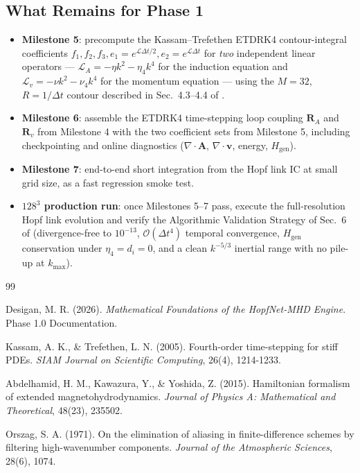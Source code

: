 \documentclass[11pt, a4paper]{article}
\renewcommand{\div}{\nabla \cdot}
\begin{document}
\subsection{What Remains for Phase 1}
\begin{itemize}
    \item \textbf{Milestone 5}: precompute the Kassam--Trefethen ETDRK4
    contour-integral coefficients $f_1, f_2, f_3, e_1=e^{\mathcal{L}\Delta
    t/2}, e_2=e^{\mathcal{L}\Delta t}$ for \emph{two} independent linear
    operators --- $\mathcal{L}_A = -\eta k^2 - \eta_4 k^4$ for the
    induction equation and $\mathcal{L}_v = -\nu k^2 - \nu_4 k^4$ for the
    momentum equation --- using the $M=32$, $R=1/\Delta t$ contour
    described in Sec.~4.3--4.4 of \citealp{foundation2026}.
    \item \textbf{Milestone 6}: assemble the ETDRK4 time-stepping loop
    coupling $\mathbf{R}_A$ and $\mathbf{R}_v$ from Milestone 4 with the
    two coefficient sets from Milestone 5, including checkpointing and
    online diagnostics ($\div\mathbf{A}$, $\div\mathbf{v}$, energy,
    $H_{\mathrm{gen}}$).
    \item \textbf{Milestone 7}: end-to-end short integration from the
    Hopf link IC at small grid size, as a fast regression smoke test.
    \item \textbf{$128^3$ production run}: once Milestones 5--7 pass,
    execute the full-resolution Hopf link evolution and verify the
    Algorithmic Validation Strategy of Sec.~6 of
    \citealp{foundation2026} (divergence-free to $10^{-13}$,
    $\mathcal{O}(\Delta t^4)$ temporal convergence, $H_{\mathrm{gen}}$
    conservation under $\eta_4=d_i=0$, and a clean $k^{-5/3}$ inertial
    range with no pile-up at $k_{\max}$).
\end{itemize}

\newpage
\begin{thebibliography}{99}

Desigan, M. R. (2026). \textit{Mathematical Foundations of the HopfNet-MHD
Engine}. Phase 1.0 Documentation.

Kassam, A. K., \& Trefethen, L. N. (2005). Fourth-order time-stepping for
stiff PDEs. \textit{SIAM Journal on Scientific Computing}, 26(4),
1214-1233.

Abdelhamid, H. M., Kawazura, Y., \& Yoshida, Z. (2015). Hamiltonian
formalism of extended magnetohydrodynamics. \textit{Journal of Physics A:
Mathematical and Theoretical}, 48(23), 235502.

Orszag, S. A. (1971). On the elimination of aliasing in finite-difference
schemes by filtering high-wavenumber components. \textit{Journal of the
Atmospheric Sciences}, 28(6), 1074.

\end{thebibliography}
\end{document}
